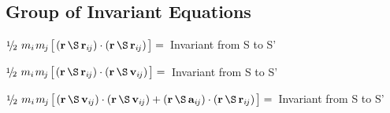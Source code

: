\documentclass[10pt]{article}
\newcommand{\mM}{m}
\newcommand{\ri}{_i}
\newcommand{\vR}{\mathbf{r}}
\newcommand{\vV}{\mathbf{v}}
\newcommand{\vA}{\mathbf{a}}
\newcommand{\rj}{_{\hspace{-0.081em}j}}
\newcommand{\rij}{_{i\hspace{-0.081em}j}}
\newcommand{\med}{\raise.5ex\hbox{$\scriptstyle 1$}\kern-.15em/\kern-.15em\lower.25ex\hbox{$\scriptstyle 2$}\:}
\begin{document}
\vspace{+2.10em}

{\centering\subsection*{\rm Group of Invariant Equations}}

\vspace{+1.50em}

\par $\med \hspace{+0.15em} \mM\ri\hspace{+0.09em}\mM\rj \hspace{+0.12em} \big[ \hspace{+0.12em} (\vR \hspace{+0.18em}{\S}\hspace{+0.18em} \vR\rij) \cdot (\vR \hspace{+0.18em}{\S}\hspace{+0.18em} \vR\rij) \hspace{+0.12em} \big] = \hspace{+0.12em}$ Invariant from S to S'
\vspace{+1.20em}
\par $\med \hspace{+0.15em} \mM\ri\hspace{+0.09em}\mM\rj \hspace{+0.12em} \big[ \hspace{+0.12em} (\vR \hspace{+0.18em}{\S}\hspace{+0.18em} \vR\rij) \cdot (\vR \hspace{+0.18em}{\S}\hspace{+0.18em} \vV\rij) \hspace{+0.12em} \big] = \hspace{+0.12em}$ Invariant from S to S'
\vspace{+1.20em}
\par $\med \hspace{+0.15em} \mM\ri\hspace{+0.09em}\mM\rj \hspace{+0.12em} \big[ \hspace{+0.12em} (\vR \hspace{+0.18em}{\S}\hspace{+0.18em} \vV\rij) \cdot (\vR \hspace{+0.18em}{\S}\hspace{+0.18em} \vV\rij) + (\vR \hspace{+0.18em}{\S}\hspace{+0.18em} \vA\rij) \cdot (\vR \hspace{+0.18em}{\S}\hspace{+0.18em} \vR\rij) \hspace{+0.12em} \big] = \hspace{+0.12em}$ Invariant from S to S'
\end{document}
